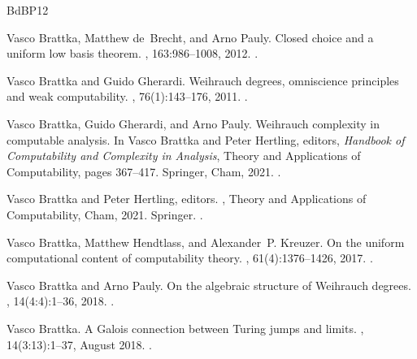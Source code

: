 \documentclass[11pt,a4paper]{amsart}
\theoremstyle{plain}
\theoremstyle{definition}
\theoremstyle{defC}
\theoremstyle{thmC}
\theoremstyle{plain}
\numberwithin{equation}{section}
\begin{document}
%


\begin{thebibliography}{BdBP12}

Vasco Brattka, Matthew de~Brecht, and Arno Pauly.
\newblock Closed choice and a uniform low basis theorem.
, 163:986--1008, 2012.
\newblock \href {https://doi.org/10.1016/j.apal.2011.12.020}
  {}.

Vasco Brattka and Guido Gherardi.
\newblock Weihrauch degrees, omniscience principles and weak computability.
, 76(1):143--176, 2011.
\newblock \href {https://doi.org/10.2178/jsl/1294170993}
  {}.

Vasco Brattka, Guido Gherardi, and Arno Pauly.
\newblock Weihrauch complexity in computable analysis.
\newblock In Vasco Brattka and Peter Hertling, editors, {\em Handbook of
  Computability and Complexity in Analysis}, Theory and Applications of
  Computability, pages 367--417. Springer, Cham, 2021.
\newblock \href {https://doi.org/10.1007/978-3-030-59234-9_11}
  {}.

Vasco Brattka and Peter Hertling, editors.
, Theory
  and Applications of Computability, Cham, 2021. Springer.
\newblock \href {https://doi.org/10.1007/978-3-030-59234-9}
  {}.

Vasco Brattka, Matthew Hendtlass, and Alexander~P. Kreuzer.
\newblock On the uniform computational content of computability theory.
, 61(4):1376--1426, 2017.
\newblock \href {https://doi.org/10.1007/s00224-017-9798-1}
  {}.

Vasco Brattka and Arno Pauly.
\newblock On the algebraic structure of {W}eihrauch degrees.
, 14(4:4):1--36, 2018.
\newblock \href {https://doi.org/10.23638/LMCS-14(4:4)2018}
  {}.

Vasco Brattka.
\newblock A {G}alois connection between {T}uring jumps and limits.
, 14(3:13):1--37, August
  2018.
\newblock \href {https://doi.org/10.23638/LMCS-14(3:13)2018}
  {}.


\end{thebibliography}
\end{document}
